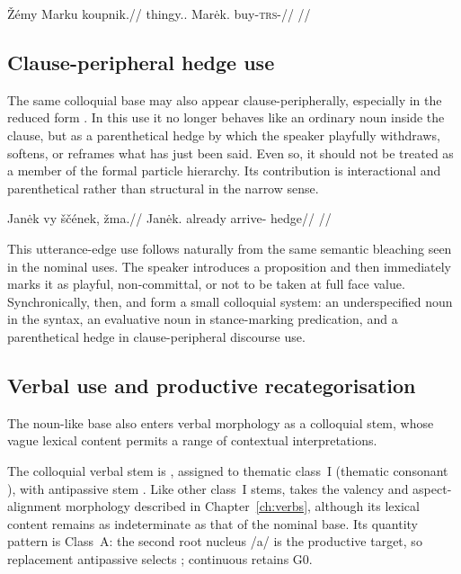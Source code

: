 \ex
\begingl
\gla Žémy Marku koupnik.//
\glb thingy.\Dir{}.\Pl{} Marėk.\Trs{} buy-\textsc{trs}-\Pf{}//
\glft {}//
\endgl
\xe

\subsection{Clause-peripheral hedge use}

The same colloquial base may also appear clause-peripherally, especially in the
reduced form . In this use it no longer behaves like an ordinary noun
inside the clause, but as a parenthetical hedge by which the speaker playfully
withdraws, softens, or reframes what has just been said. Even so, it should not
be treated as a member of the formal particle hierarchy. Its contribution is
interactional and parenthetical rather than structural in the narrow sense.

\pex
\begingl
\gla Janėk vy ščének, žma.//
\glb Janėk.\Dir{} already arrive-\Pf{} hedge//
\glft {}//
\endgl
\xe

This utterance-edge use follows naturally from the same semantic bleaching seen
in the nominal uses. The speaker introduces a proposition and then immediately
marks it as playful, non-committal, or not to be taken at full face value.
Synchronically, then,  and  form a small colloquial system:
an underspecified noun in the syntax, an evaluative noun in stance-marking
predication, and a parenthetical hedge in clause-peripheral discourse use.

\subsection{Verbal use and productive
recategorisation}\label{sec:spoken-zema-verbal}

The noun-like base also enters verbal morphology as a colloquial stem,
whose vague lexical content permits a range of contextual interpretations.

The colloquial verbal stem is , assigned to thematic class~I
(thematic consonant ), with antipassive stem . Like
other class~I stems,  takes the valency and
aspect-alignment morphology described in Chapter~\ref{ch:verbs}, although its
lexical content remains as indeterminate as that of the nominal base.
Its quantity pattern is Class~A: the second root nucleus /a/ is the
productive target, so replacement antipassive selects ;
continuous  retains G0.

